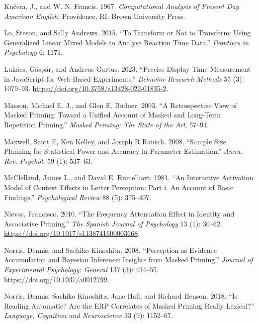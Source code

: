 \documentclass[
]{interact}
\newlength{\cslhangindent}
\newenvironment{CSLReferences}[2] %
 {\begin{list}{}{%
  \setlength{\itemindent}{0pt}
  \setlength{\leftmargin}{0pt}
  \setlength{\parsep}{0pt}
  \ifodd #1
   \setlength{\leftmargin}{\cslhangindent}
   \setlength{\itemindent}{-1\cslhangindent}
  \fi
  \setlength{\itemsep}{#2\baselineskip}}}
 {\end{list}}
\begin{document}
\begin{CSLReferences}{1}{0}
Kučera, J., and W. N. Francis. 1967. \emph{Computational Analysis of
Present Day American English}. Providence, RI: Brown University Press.

Lo, Steson, and Sally Andrews. 2015. {``To Transform or Not to
Transform: Using Generalized Linear Mixed Models to Analyse Reaction
Time Data.''} \emph{Frontiers in Psychology} 6: 1171.

Lukács, Gáspár, and Andreas Gartus. 2023. {``Precise Display Time
Measurement in JavaScript for Web-Based Experiments.''} \emph{Behavior
Research Methods} 55 (3): 1079--93.
\url{https://doi.org/10.3758/s13428-022-01835-2}.

Masson, Michael E. J., and Glen E. Bodner. 2003. {``A Retrospective View
of Masked Priming: Toward a Unified Account of Masked and Long-Term
Repetition Priming.''} \emph{Masked Priming: The State of the Art},
57--94.

Maxwell, Scott E, Ken Kelley, and Joseph R Rausch. 2008. {``Sample Size
Planning for Statistical Power and Accuracy in Parameter Estimation.''}
\emph{Annu. Rev. Psychol.} 59 (1): 537--63.

McClelland, James L., and David E. Rumelhart. 1981. {``An Interactive
Activation Model of Context Effects in Letter Perception: Part i. An
Account of Basic Findings.''} \emph{Psychological Review} 88 (5):
375--407.

Nievas, Francisco. 2010. {``The Frequency Attenuation Effect in Identity
and Associative Priming.''} \emph{The Spanish Journal of Psychology} 13
(1): 30--62. \url{https://doi.org/10.1017/s1138741600003668}.

Norris, Dennis, and Sachiko Kinoshita. 2008. {``Perception as Evidence
Accumulation and Bayesian Inference: Insights from Masked Priming.''}
\emph{Journal of Experimental Psychology: General} 137 (3): 434--55.
\url{https://doi.org/10.1037/a0012799}.

Norris, Dennis, Sachiko Kinoshita, Jane Hall, and Richard Henson. 2018.
{``Is Reading Automatic? Are the ERP Correlates of Masked Priming Really
Lexical?''} \emph{Language, Cognition and Neuroscience} 33 (9):
1152--67.


\end{CSLReferences}
\end{document}
